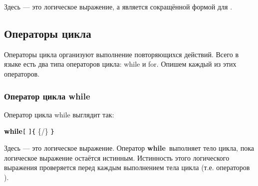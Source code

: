 \documentclass[10pt]{report}
\begin{document}
\noindent\textcolor{Green}{}

Здесь \textcolor{Green}{} --- это логическое выражение, а
\textcolor{Green}{} является сокращённой формой для
\textcolor{Green}{}.


    \subsection{Операторы цикла}
Операторы цикла организуют выполнение повторяющихся действий. Всего в языке есть два типа операторов цикла: while и for. Опишем каждый из этих операторов.


        \subsubsection{Оператор цикла while}
Оператор цикла while выглядит так:
\begin{center}
\textcolor{Black}{\textbf{while}}\textcolor{Black}{\texttt{[}}%
\textcolor{Black}{\texttt{]}}\textcolor{Black}{\texttt{\{}} \{/\} \textcolor{Black}{\texttt{\} }}
\end{center}
Здесь \textcolor{Green}{} --- это логическое выражение.
Оператор \textbf{\glqq while\grqq}\ выполняет тело цикла, пока логическое выражение
\textcolor{Green}{} остаётся истинным. Истинность этого логического выражения проверяется перед каждым выполнением тела цикла (т.е.
операторов \textcolor{Green}{}).
    
\end{document}
